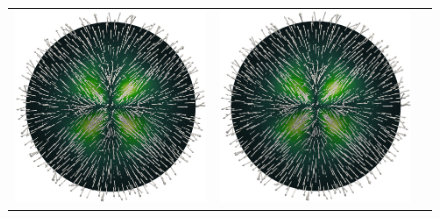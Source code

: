 \begin{figure}[H]
	\begin{center}
		\begin{tabular}[c]{c c c}
			\includegraphics[scale=.15]{recoveredVelocity_glyphs.png} &
			\includegraphics[scale=.15]{trueVelocity_glyphs.png} &

\end{tabular}
\end{center}
\end{figure}
